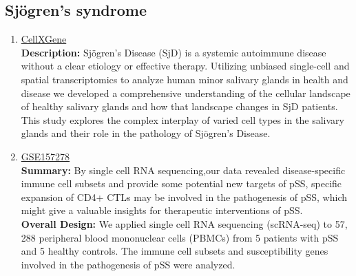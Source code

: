 \documentclass[times, twoside, watermark]{zHenriquesLab-StyleBioRxiv}
\begin{document}
\subsection{Sjögren's syndrome}
\begin{enumerate}
	\item \href{https://cellxgene.cziscience.com/collections/21bbfaec-6958-46bc-b1cd-1535752f6304}{CellXGene} \cite{Pranzatelli_2025}
			\\ \textbf{Description:}
			Sjögren's Disease (SjD) is a systemic autoimmune disease without a clear etiology or effective therapy. Utilizing unbiased single-cell and spatial transcriptomics to analyze human minor salivary glands in health and disease we developed a comprehensive understanding of the cellular landscape of healthy salivary glands and how that landscape changes in SjD patients. This study explores the complex interplay of varied cell types in the salivary glands and their role in the pathology of Sjögren's Disease.
	\item \href{https://www.ncbi.nlm.nih.gov/geo/query/acc.cgi?acc=GSE157278}{GSE157278} \cite{Hong_2021}
			\\ \textbf{Summary:}
			By single cell RNA sequencing,our data revealed disease-specific immune cell subsets and provide some potential new targets of pSS, specific expansion of CD4+ CTLs may be involved in the pathogenesis of pSS, which might give a valuable insights for therapeutic interventions of pSS.
			\\ \textbf{Overall Design:}
			We applied single cell RNA sequencing (scRNA-seq) to 57, 288 peripheral blood mononuclear cells (PBMCs) from 5 patients with pSS and 5 healthy controls. The immune cell subsets and susceptibility genes involved in the pathogenesis of pSS were analyzed.
\end{enumerate}

\end{document}
